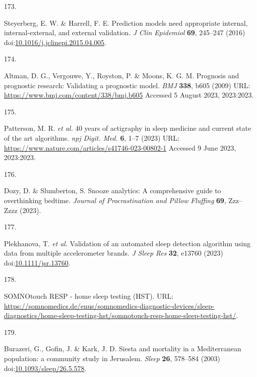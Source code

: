 \documentclass[
  10pt,
]{scrbook}
\newlength{\cslhangindent}
\newlength{\csllabelwidth}
\newlength{\cslentryspacingunit} %
\newenvironment{CSLReferences}[2] %
 {%
  \setlength{\parindent}{0pt}
  \ifodd #1
  \let\oldpar\par
  \def\par{\hangindent=\cslhangindent\oldpar}
  \fi
  \setlength{\parskip}{#2\cslentryspacingunit}
 }%
 {}
\newcommand{\CSLLeftMargin}[1]{\parbox[t]{\csllabelwidth}{#1}}
\newcommand{\CSLRightInline}[1]{\parbox[t]{\linewidth - \csllabelwidth}{#1}\break}
\let\originaltextbf\textbf
\renewcommand{\textbf}[1]{\textcolor{color1}{\textsf{\originaltextbf{#1}}}}
\begin{document}
\begin{CSLReferences}{0}{0}
\leavevmode{}%
\CSLLeftMargin{173. }%
\CSLRightInline{Steyerberg, E. W. \& Harrell, F. E. Prediction models
need appropriate internal, internal-external, and external validation.
\emph{J Clin Epidemiol} \textbf{69}, 245--247 (2016)
doi:\href{https://doi.org/10.1016/j.jclinepi.2015.04.005}{10.1016/j.jclinepi.2015.04.005}.}

\leavevmode{}%
\CSLLeftMargin{174. }%
\CSLRightInline{Altman, D. G., Vergouwe, Y., Royston, P. \& Moons, K. G.
M. Prognosis and prognostic research: Validating a prognostic model.
\emph{{BMJ}} \textbf{338}, b605 (2009) URL:
\url{https://www.bmj.com/content/338/bmj.b605} Accessed 5 August 2023,
2023:2023.}

\leavevmode{}%
\CSLLeftMargin{175. }%
\CSLRightInline{Patterson, M. R. \emph{et al.} 40 years of actigraphy in
sleep medicine and current state of the art algorithms. \emph{npj Digit.
Med.} \textbf{6}, 1--7 (2023) URL:
\url{https://www.nature.com/articles/s41746-023-00802-1} Accessed 9 June
2023, 2023:2023.}

\leavevmode{}%
\CSLLeftMargin{176. }%
\CSLRightInline{Dozy, D. \& Slumberton, S. Snooze analytics: A
comprehensive guide to overthinking bedtime. \emph{Journal of
Procrastination and Pillow Fluffing} \textbf{69}, Zzz--Zzzz (2023).}

\leavevmode{}%
\CSLLeftMargin{177. }%
\CSLRightInline{Plekhanova, T. \emph{et al.} Validation of an automated
sleep detection algorithm using data from multiple accelerometer brands.
\emph{J Sleep Res} \textbf{32}, e13760 (2023)
doi:\href{https://doi.org/10.1111/jsr.13760}{10.1111/jsr.13760}.}

\leavevmode{}%
\CSLLeftMargin{178. }%
\CSLRightInline{SOMNOtouch{\texttrademark} RESP - home sleep testing
(HST). URL:
\url{https://somnomedics.de/enus/somnomedics-diagnostic-devices/sleep-diagnostics/home-sleep-testing-hst/somnotouch-resp-home-sleep-testing-hst/}.}

\leavevmode{}%
\CSLLeftMargin{179. }%
\CSLRightInline{Burazeri, G., Gofin, J. \& Kark, J. D. Siesta and
mortality in a Mediterranean population: a community study in Jerusalem.
\emph{Sleep} \textbf{26}, 578--584 (2003)
doi:\href{https://doi.org/10.1093/sleep/26.5.578}{10.1093/sleep/26.5.578}.}


\end{CSLReferences}
\end{document}
